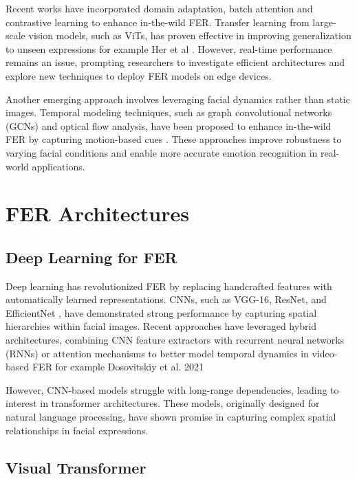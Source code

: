  
Recent works have incorporated domain adaptation, batch attention and contrastive learning to enhance \gls{in-the-wild} FER. Transfer learning from large-scale vision models, such as ViTs, has proven effective in improving generalization to unseen expressions for example Her et al \cite{her_batch_2024}. However, real-time performance remains an issue, prompting researchers to investigate efficient architectures and explore new techniques to deploy FER models on edge devices.


Another emerging approach involves leveraging facial dynamics rather than static images. Temporal modeling techniques, such as graph convolutional networks (GCNs) and optical flow analysis, have been proposed to enhance \gls{in-the-wild} FER by capturing motion-based cues \cite{wang_survey_2024}. These approaches improve robustness to varying facial conditions and enable more accurate emotion recognition in real-world applications. 

\section{FER Architectures}


\subsection{Deep Learning for FER}

Deep learning has revolutionized FER by replacing handcrafted features with automatically learned representations. CNNs, such as VGG-16, ResNet, and EfficientNet \cite{tan_efficientnet_2020}, have demonstrated strong performance by capturing spatial hierarchies within facial images. Recent approaches have leveraged hybrid architectures, combining CNN feature extractors with recurrent neural networks (RNNs) or attention mechanisms to better model temporal dynamics in video-based FER for example Dosovitskiy et al. 2021 \cite{dosovitskiy_image_2021} 

However, CNN-based models struggle with long-range dependencies, leading to interest in transformer architectures. These models, originally designed for natural language processing, have shown promise in capturing complex spatial relationships in facial expressions. 

\subsection{Visual Transformer}

